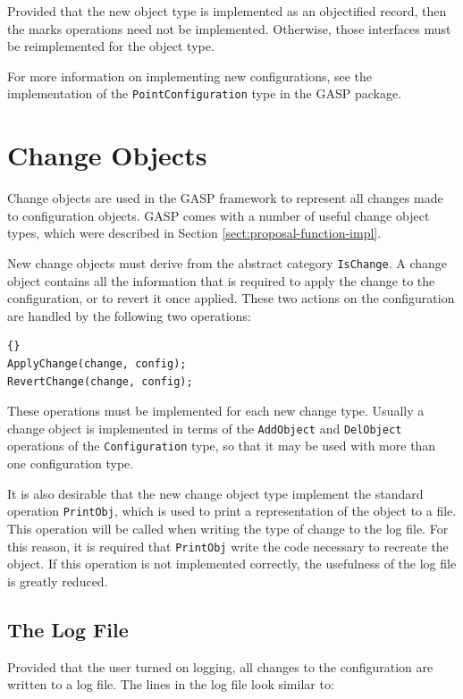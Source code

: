 Provided that the new object type is implemented as an objectified
record, then the marks operations need not be implemented.  Otherwise,
those interfaces must be reimplemented for the object type.

For more information on implementing new configurations, see the
implementation of the \texttt{Point\-Configuration} type in the GASP
package.

\section{Change Objects}

Change objects are used in the GASP framework to represent all changes
made to configuration objects.  GASP comes with a number of useful
change object types, which were described in Section
\ref{sect:proposal-function-impl}.

New change objects must derive from the abstract category
\texttt{IsChange}.  A change object contains all the information that
is required to apply the change to the configuration, or to revert it
once applied.  These two actions on the configuration are handled by
the following two operations:

\begin{lstlisting}{}
ApplyChange(change, config);
RevertChange(change, config);
\end{lstlisting}

\noindent These operations must be implemented for each new change
type.  Usually a change object is implemented in terms of the
\texttt{AddObject} and \texttt{DelObject} operations of the
\texttt{Configuration} type, so that it may be used with more than one
configuration type.

It is also desirable that the new change object type implement the
standard \GAP{} operation \texttt{PrintObj}, which is used to print a
representation of the object to a file.  This operation will be called
when writing the type of change to the log file.  For this reason, it
is required that \texttt{PrintObj} write the code necessary to
recreate the object.  If this operation is not implemented correctly,
the usefulness of the log file is greatly reduced.

\subsection{The Log File}\label{sect:log-file}

Provided that the user turned on logging, all changes to the
configuration are written to a log file.  The lines in the log file
look similar to:

